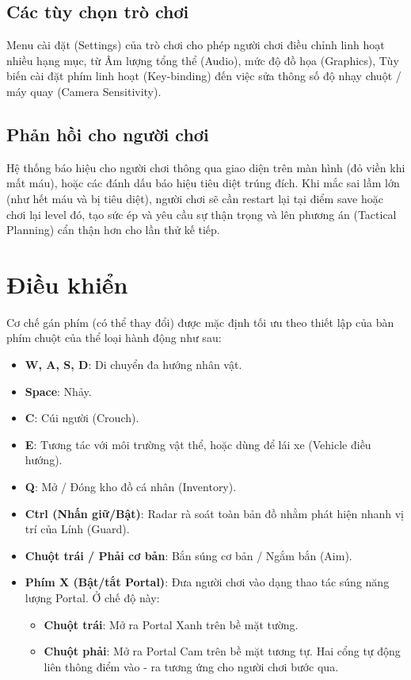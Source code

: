\documentclass[../DoAn.tex]{subfiles}
\begin{document}
\subsection{Các tùy chọn trò chơi}
Menu cài đặt (Settings) của trò chơi cho phép người chơi điều chỉnh linh hoạt nhiều hạng mục, từ Âm lượng tổng thể (Audio), mức độ đồ họa  (Graphics), Tùy biến cài đặt phím linh hoạt (Key-binding) đến việc sửa thông số độ nhạy chuột / máy quay (Camera Sensitivity).

\subsection{Phản hồi cho người chơi}
Hệ thống báo hiệu cho người chơi thông qua giao diện trên màn hình (đỏ viền khi mất máu), hoặc các đánh dấu báo hiệu tiêu diệt trúng đích. Khi mắc sai lầm lớn (như hết máu và bị tiêu diệt), người chơi sẽ cần restart lại tại điểm save hoặc chơi lại level đó, tạo sức ép và yêu cầu sự thận trọng và lên phương án (Tactical Planning) cẩn thận hơn cho lần thử kế tiếp.

\section{Điều khiển}
Cơ chế gán phím (có thể thay đổi) được mặc định tối ưu theo thiết lập của bàn phím chuột của thể loại hành động như sau:
\begin{itemize}
    \item \textbf{W, A, S, D}: Di chuyển đa hướng nhân vật.
    \item \textbf{Space}: Nhảy.
    \item \textbf{C}: Cúi người (Crouch).
    \item \textbf{E}: Tương tác với môi trường vật thể, hoặc dùng để lái xe (Vehicle điều hướng).
    \item \textbf{Q}: Mở / Đóng kho đồ cá nhân (Inventory).
    \item \textbf{Ctrl (Nhấn giữ/Bật)}: Radar rà soát toàn bản đồ nhằm phát hiện nhanh vị trí của Lính (Guard).
    \item \textbf{Chuột trái / Phải cơ bản}: Bắn súng cơ bản / Ngắm bắn (Aim).
    \item \textbf{Phím X (Bật/tắt Portal)}: Đưa người chơi vào dạng thao tác súng năng lượng Portal. Ở chế độ này: 
    \begin{itemize}
        \item \textbf{Chuột trái}: Mở ra Portal Xanh trên bề mặt tường.
        \item \textbf{Chuột phải}: Mở ra Portal Cam trên bề mặt tương tự. Hai cổng tự động liên thông điểm vào - ra tương ứng cho người chơi bước qua.
    \end{itemize}
\end{itemize}
\end{document}
